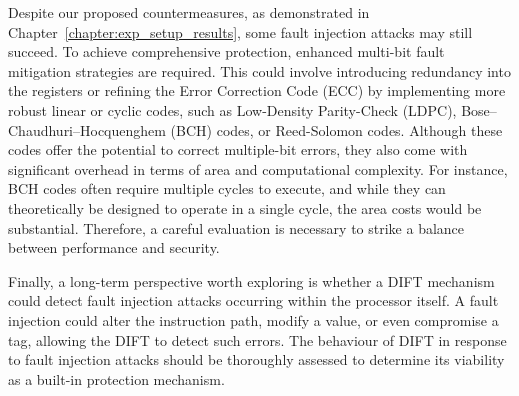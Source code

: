 Despite our proposed countermeasures, as demonstrated in Chapter~\ref{chapter:exp_setup_results}, some fault injection attacks may still succeed. To achieve comprehensive protection, enhanced multi-bit fault mitigation strategies are required. This could involve introducing redundancy into the registers or refining the Error Correction Code (ECC) by implementing more robust linear or cyclic codes, such as Low-Density Parity-Check (LDPC), Bose–Chaudhuri–Hocquenghem (BCH) codes, or Reed-Solomon codes. Although these codes offer the potential to correct multiple-bit errors, they also come with significant overhead in terms of area and computational complexity. For instance, BCH codes often require multiple cycles to execute, and while they can theoretically be designed to operate in a single cycle, the area costs would be substantial. Therefore, a careful evaluation is necessary to strike a balance between performance and security.

Finally, a long-term perspective worth exploring is whether a DIFT mechanism could detect fault injection attacks occurring within the processor itself. A fault injection could alter the instruction path, modify a value, or even compromise a tag, allowing the DIFT to detect such errors. The behaviour of DIFT in response to fault injection attacks should be thoroughly assessed to determine its viability as a built-in protection mechanism.

